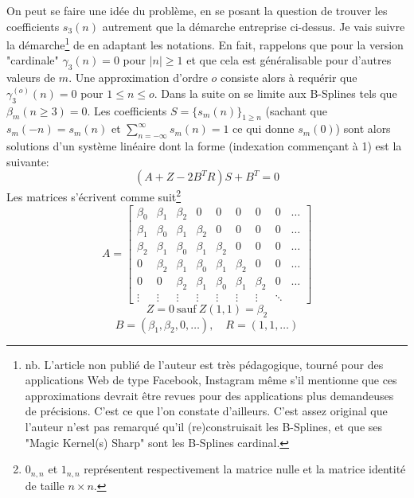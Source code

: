 \documentclass[11pt,twoside]{article}
\begin{document}
On peut se faire une idée du problème, en se posant la question de trouver les coefficients $s_3(n)$ autrement que la démarche entreprise ci-dessus. Je vais suivre la démarche\footnote{nb. L'article non publié de l'auteur est très pédagogique, tourné pour des applications Web de type Facebook, Instagram même s'il mentionne que ces approximations devrait être revues pour des applications plus demandeuses de précisions. C'est ce que l'on constate d'ailleurs. C'est assez original que l'auteur n'est pas remarqué qu'il (re)construisait les B-Splines, et que ses "Magic Kernel(s) Sharp" sont les B-Splines cardinal.} de \cite{Costella2021} en adaptant les notations. En fait, rappelons que pour la version "cardinale" $\gamma_3(n)=0$ pour $|n|\geq 1$ et que cela est généralisable pour d'autres valeurs de $m$. Une approximation d'ordre $o$ consiste alors à requérir que $\gamma^{(o)}_3(n)=0$ pour $1\leq n\leq o$. Dans la suite on se limite aux  B-Splines tels que $\beta_m(n\geq 3)=0$. Les coefficients $S=\{s_m(n)\}_{1\geq n}$ (sachant que $s_m(-n)=s_m(n)$ et $\sum_{n=-\infty}^\infty s_m(n)=1$ ce qui donne $s_m(0)$) sont alors solutions d'un système linéaire dont la forme (indexation commençant à 1) est la suivante:
\begin{equation}
(A+Z-2B^T R)S+B^T = 0
\end{equation}
 Les matrices s'écrivent comme suit\footnote{$0_{n,n}$ et $1_{n,n}$ représentent respectivement la matrice nulle et la matrice identité de taille $n\times n$.} 
\begin{equation}
A= \begin{bmatrix}
\beta_0 & \beta_1&\beta_2 & 0 & 0 & 0 & 0 & 0 &\ldots\\
\beta_1 & \beta_0 & \beta_1&\beta_2 & 0 & 0 &0 & 0 &\ldots \\
\beta_2 & \beta_1 & \beta_0 & \beta_1&\beta_2 & 0 & 0&0 & \ldots\\
0 & \beta_2 & \beta_1 & \beta_0 & \beta_1&\beta_2 & 0 &0& \ldots\\
0& 0 & \beta_2 & \beta_1 & \beta_0 & \beta_1&\beta_2 & 0 & \ldots\\
\vdots & \vdots & \vdots  & \vdots & \vdots &\vdots & \vdots & \ddots
\end{bmatrix}
\end{equation}
\begin{equation}
Z = 0\ \mathrm{sauf}\  Z(1,1)=\beta_2
\end{equation}
\begin{equation}
B = (\beta_1,\beta_2,0,\ldots), \quad R=(1,1,\ldots)
\end{equation}
\end{document}
